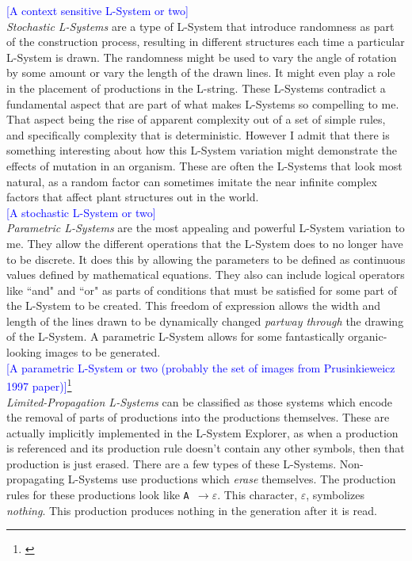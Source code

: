 \documentclass[12pt,twoside]{reedthesis}
\newcommand{\code}[1]{\texttt{#1}}
\begin{document}
	\textcolor{blue}{[A context sensitive L-System or two]}\\
	
	\textit{Stochastic L-Systems} are a type of L-System that introduce randomness as part of the construction process, resulting in different structures each time a particular L-System is drawn. The randomness might be used to vary the angle of rotation by some amount or vary the length of the drawn lines. It might even play a role in the placement of productions in the L-string. These L-Systems contradict a fundamental aspect that are part of what makes L-Systems so compelling to me. That aspect being the rise of apparent complexity out of a set of simple rules, and specifically complexity that is deterministic. However I admit that there is something interesting about how this L-System variation might demonstrate the effects of mutation in an organism. These are often the L-Systems that look most natural, as a random factor can sometimes imitate the near infinite complex factors that affect plant structures out in the world.\\
	
	\textcolor{blue}{[A stochastic L-System or two]}\\
	
	\textit{Parametric L-Systems} are the most appealing and powerful L-System variation to me. They allow the different operations that the L-System does to no longer have to be discrete. It does this by allowing the parameters to be defined as continuous values defined by mathematical equations. They also can include logical operators like ``and" and ``or" as parts of conditions that must be satisfied for some part of the L-System to be created. This freedom of expression allows the width and length of the lines drawn to be dynamically changed \textit{partway through} the drawing of the L-System. A parametric L-System allows for some fantastically organic-looking images to be generated.\\
	
	\textcolor{blue}{[A parametric L-System or two (probably the set of images from Prusinkieweicz 1997 paper)]}\footnote{\cite{LSystems2001}}\\
	
	\textit{Limited-Propagation L-Systems} can be classified as those systems which encode the removal of parts of productions into the productions themselves. These are actually implicitly implemented in the L-System Explorer, as when a production is referenced and its production rule doesn't contain any other symbols, then that production is just erased. There are a few types of these L-Systems. Non-propagating L-Systems use productions which \textit{erase} themselves. The production rules for these productions look like \code{A $\rightarrow \varepsilon$}. This character, $\varepsilon$, symbolizes \textit{nothing}. This production produces nothing in the generation after it is read. \\
	
\end{document}
